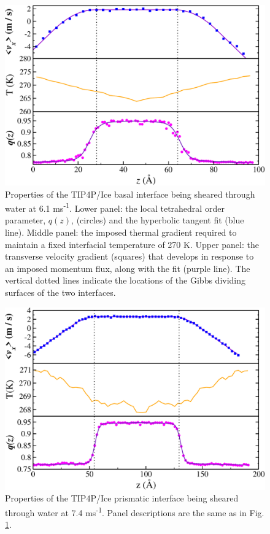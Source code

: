 \begin{figure}
\includegraphics[width=\linewidth]{Figures/Basal_TIP4PIce_Plot}
\caption{\label{fig:tipbComic} Properties of the TIP4P/Ice basal
  interface being sheared through water at 6.1
  ms\textsuperscript{-1}. Lower panel: the local tetrahedral order
  parameter, $q(z)$, (circles) and the hyperbolic tangent fit
  (blue line).  Middle panel: the imposed thermal gradient
  required to maintain a fixed interfacial temperature of 270 K. Upper
  panel: the transverse velocity gradient (squares) that develops in
  response to an imposed momentum flux, along with the fit (purple
  line). The vertical dotted lines indicate the locations of the Gibbs
  dividing surfaces of the two interfaces.}
\end{figure}

\begin{figure}
\includegraphics[width=\linewidth]{Figures/Prism_TIP4PIce_Plot}
\caption{\label{fig:tippComic} Properties of the TIP4P/Ice prismatic
  interface being sheared through water at 7.4 ms\textsuperscript{-1}.
  Panel descriptions are the same as in Fig. \ref{fig:tipbComic}.}
\end{figure}

